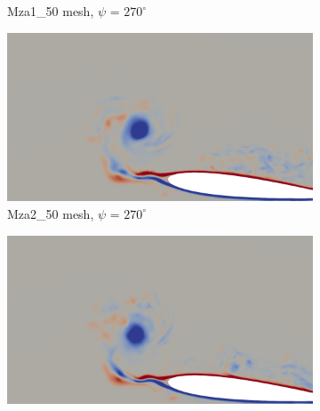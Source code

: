 \begin{figure}[H]
\begin{subfigure}[b]{0.475\textwidth}
		\caption{Mza1\_50 mesh, $\psi$ = $270^\circ$}
		\label{fig:Mza1_50_sp_psi270}
	\end{subfigure}
	\begin{subfigure}[b]{0.475\textwidth}
		\centering
		\includegraphics[width=1\textwidth]{figures/zonal_adapt_results/vorticity_plots/v3/Mza2_50/spavg/phase_270.png}
		\caption{Mza2\_50 mesh, $\psi$ = $270^\circ$}
		\label{fig:Mza2_50_sp_psi270}
	\end{subfigure}	
	\begin{subfigure}[b]{0.475\textwidth}
		\centering
		\includegraphics[width=1\textwidth]{figures/zonal_adapt_results/vorticity_plots/v3/Mza2_100/spavg/phase_270.png}

\end{subfigure}
\end{figure}
